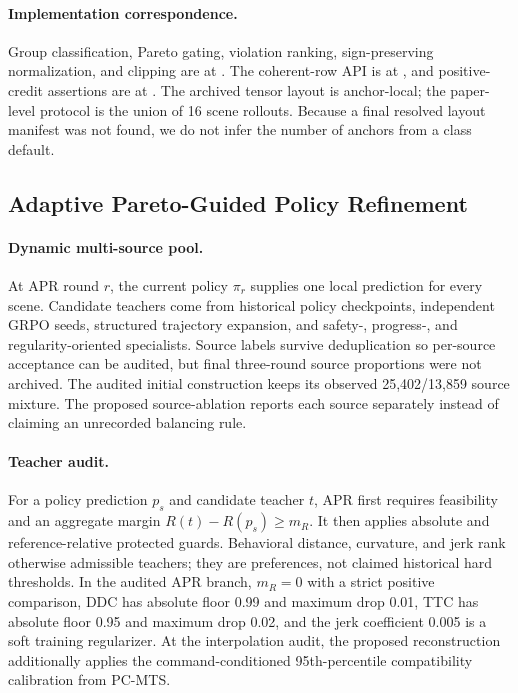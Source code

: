 \paragraph{Implementation correspondence.}
Group classification, Pareto gating, violation ranking, sign-preserving
normalization, and clipping are at
.
The coherent-row API is at
,
and positive-credit assertions are at
.
The archived tensor layout is anchor-local; the paper-level protocol is the
union of 16 scene rollouts.  Because a final resolved layout manifest was not
found, we do not infer the number of anchors from a class default.

\subsection{Adaptive Pareto-Guided Policy Refinement}
\label{sec:apr-details}

\paragraph{Dynamic multi-source pool.}
At APR round $r$, the current policy $\pi_r$ supplies one local prediction for
every scene.  Candidate teachers come from historical policy checkpoints,
independent GRPO seeds, structured trajectory expansion, and safety-,
progress-, and regularity-oriented specialists.  Source labels survive
deduplication so per-source acceptance can be audited, but final three-round
source proportions were not archived.  The audited initial construction keeps
its observed 25,402/13,859 source mixture.  The proposed source-ablation reports
each source separately instead of claiming an unrecorded balancing rule.

\paragraph{Teacher audit.}
For a policy prediction $p_s$ and candidate teacher $t$, APR first requires
feasibility and an aggregate margin $R(t)-R(p_s)\geq m_R$.  It then applies
absolute and reference-relative protected guards.  Behavioral distance,
curvature, and jerk rank otherwise admissible teachers; they are preferences,
not claimed historical hard thresholds.  In the audited APR branch,
$m_R=0$ with a strict positive comparison, DDC has absolute floor 0.99 and
maximum drop 0.01, TTC has absolute floor 0.95 and maximum drop 0.02, and the
jerk coefficient 0.005 is a soft training regularizer.  At the interpolation
audit, the proposed reconstruction additionally applies the command-conditioned
95th-percentile compatibility calibration from PC-MTS.

